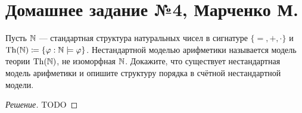 


\section*{Домашнее задание №4, Марченко М.}
    \begin{problem}[1]
        Пусть \(\mathbb{N}\) --- стандартная структура натуральных чисел в сигнатуре \(\{=, +, \cdot\}\) и \linebreak \(\operatorname{Th}(\mathbb{N}) \coloneq \{\varphi : \mathbb{N} \models \varphi\}\). Нестандартной моделью арифметики называется модель теории \(\operatorname{Th}(\mathbb{N})\), не изоморфная \(\mathbb{N}\). Докажите, что существует нестандартная модель арифметики и опишите структуру порядка в счётной нестандартной модели. 
    \end{problem}
    \begin{proof}[Решение]
        TODO
    \end{proof}

